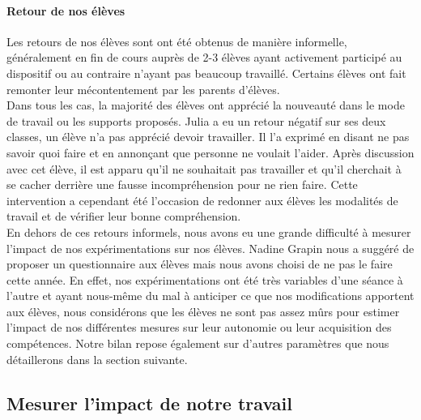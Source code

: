 \paragraph*{Retour de nos élèves}
Les retours de nos élèves sont ont été obtenus de manière informelle, généralement en fin de cours auprès de 2-3 élèves ayant activement participé au dispositif ou au contraire n'ayant pas beaucoup travaillé. Certains élèves ont fait remonter leur mécontentement par les parents d'élèves.\\
Dans tous les cas, la majorité des élèves ont apprécié la nouveauté dans le mode de travail ou les supports proposés. Julia a eu un retour négatif sur ses deux classes, un élève n'a pas apprécié devoir travailler. Il l'a exprimé en disant ne pas savoir quoi faire et en annonçant que personne ne voulait l'aider. Après discussion avec cet élève, il est apparu qu'il ne souhaitait pas travailler et qu'il cherchait à se cacher derrière une fausse incompréhension pour ne rien faire. Cette intervention a cependant été l'occasion de redonner aux élèves les modalités de travail et de vérifier leur bonne compréhension.\\
En dehors de ces retours informels, nous avons eu une grande difficulté à mesurer l'impact de nos expérimentations sur nos élèves. Nadine Grapin nous a suggéré de proposer un questionnaire aux élèves mais nous avons choisi de ne pas le faire cette année. En effet, nos expérimentations ont été très variables d'une séance à l'autre et ayant nous-même du mal à anticiper ce que nos modifications apportent aux élèves, nous considérons que les élèves ne sont pas assez mûrs pour estimer l'impact de nos différentes mesures sur leur autonomie ou leur acquisition des compétences. Notre bilan repose également sur d'autres paramètres que nous détaillerons dans la section suivante.
\subsection{Mesurer l’impact de notre travail}
